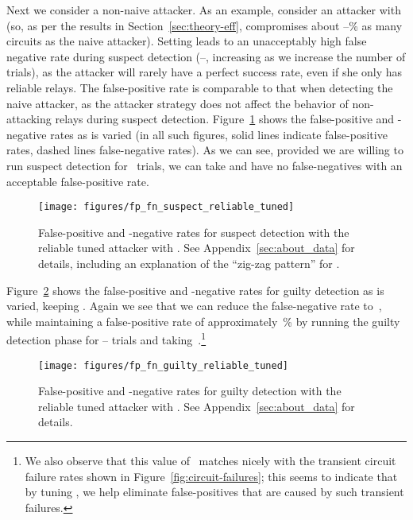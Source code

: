 \documentclass[]{lmcs}
\begin{document}
Next we consider a non-naive attacker.  
As an example, consider an attacker with
 (so, as per the results in
Section~\ref{sec:theory-eff}, compromises about --\% as many circuits
as the naive attacker).  Setting  leads to an unacceptably
high false negative rate during suspect detection (--, increasing
as we increase the number of trials), as the attacker will rarely have
a perfect success rate, even if she only has reliable relays.  
The false-positive rate is comparable to that when detecting the naive
attacker, as the attacker strategy does not affect the
behavior of non-attacking relays during suspect detection.
Figure~\ref{fig:suspect_fp_fn_reliable_tuned} shows the false-positive
and -negative rates as  is varied (in all such figures, solid lines 
indicate false-positive rates, dashed lines false-negative rates).  
As we can see, provided we are
willing to run suspect detection for~ trials, we can take
 and have no false-negatives with an acceptable false-positive rate.
\begin{figure}
\begin{center}
\texttt{[image: figures/fp\_fn\_suspect\_reliable\_tuned]}
\end{center}
\caption{False-positive and -negative rates for suspect detection with
the reliable tuned attacker with .
See Appendix~\ref{sec:about_data} for details, including an explanation
of the ``zig-zag pattern'' for .}
\label{fig:suspect_fp_fn_reliable_tuned}
\end{figure}
Figure~\ref{fig:guilty_fp_fn_reliable_tuned} shows the false-positive
and -negative rates for guilty detection
as  is varied, keeping .  Again we see
that we can reduce the false-negative rate to~, while maintaining
a false-positive rate of approximately~\% by running the guilty detection
phase for -- trials and taking~.\footnote{We also observe
that this value of~ matches nicely with the transient circuit
failure rates shown in Figure~\ref{fig:circuit-failures}; this seems to
indicate that by tuning , we help eliminate false-positives that
are caused by such transient failures.}
\begin{figure}
\begin{center}
\texttt{[image: figures/fp\_fn\_guilty\_reliable\_tuned]}
\end{center}
\caption{False-positive and -negative rates for guilty detection with
the reliable tuned attacker with .
See Appendix~\ref{sec:about_data} for details.}
\label{fig:guilty_fp_fn_reliable_tuned}
\end{figure}
\end{document}
